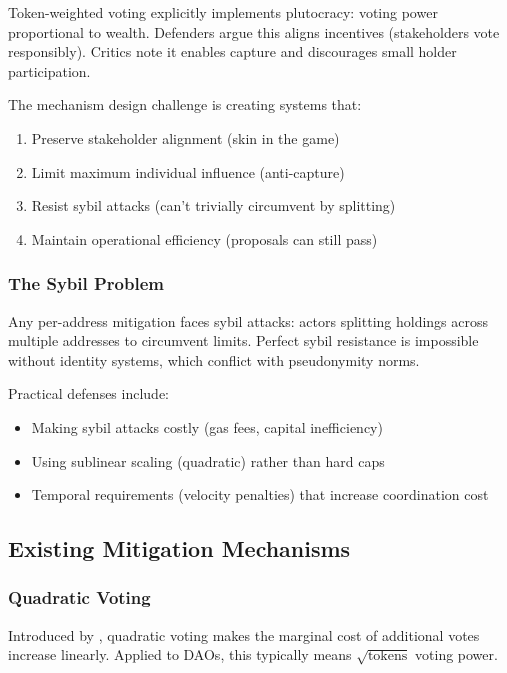 Token-weighted voting explicitly implements plutocracy: voting power proportional to wealth. Defenders argue this aligns incentives (stakeholders vote responsibly). Critics note it enables capture and discourages small holder participation.

The mechanism design challenge is creating systems that:
\begin{enumerate}
    \item Preserve stakeholder alignment (skin in the game)
    \item Limit maximum individual influence (anti-capture)
    \item Resist sybil attacks (can't trivially circumvent by splitting)
    \item Maintain operational efficiency (proposals can still pass)
\end{enumerate}

\subsubsection{The Sybil Problem}

Any per-address mitigation faces sybil attacks: actors splitting holdings across multiple addresses to circumvent limits. Perfect sybil resistance is impossible without identity systems, which conflict with pseudonymity norms.

Practical defenses include:
\begin{itemize}
    \item Making sybil attacks costly (gas fees, capital inefficiency)
    \item Using sublinear scaling (quadratic) rather than hard caps
    \item Temporal requirements (velocity penalties) that increase coordination cost
\end{itemize}

\subsection{Existing Mitigation Mechanisms}

\subsubsection{Quadratic Voting}

Introduced by \citet{weyl2018quadratic}, quadratic voting makes the marginal cost of additional votes increase linearly. Applied to DAOs, this typically means $\sqrt{\text{tokens}}$ voting power.

